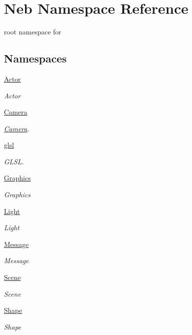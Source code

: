 \hypertarget{namespaceNeb}{\section{Neb Namespace Reference}
\label{namespaceNeb}
}


root namespace for   


\subsection*{Namespaces}
\begin{DoxyCompactItemize}
\item 
\hyperlink{namespaceNeb_1_1Actor}{Actor}
\begin{DoxyCompactList}\small\item\em Actor \end{DoxyCompactList}\item 
\hyperlink{namespaceNeb_1_1Camera}{Camera}
\begin{DoxyCompactList}\small\item\em \hyperlink{namespaceNeb_1_1Camera}{Camera}. \end{DoxyCompactList}\item 
\hyperlink{namespaceNeb_1_1glsl}{glsl}
\begin{DoxyCompactList}\small\item\em G\-L\-S\-L. \end{DoxyCompactList}\item 
\hyperlink{namespaceNeb_1_1Graphics}{Graphics}
\begin{DoxyCompactList}\small\item\em Graphics \end{DoxyCompactList}\item 
\hyperlink{namespaceNeb_1_1Light}{Light}
\begin{DoxyCompactList}\small\item\em Light \end{DoxyCompactList}\item 
\hyperlink{namespaceNeb_1_1Message}{Message}
\begin{DoxyCompactList}\small\item\em Message \end{DoxyCompactList}\item 
\hyperlink{namespaceNeb_1_1Scene}{Scene}
\begin{DoxyCompactList}\small\item\em Scene \end{DoxyCompactList}\item 
\hyperlink{namespaceNeb_1_1Shape}{Shape}
\begin{DoxyCompactList}\small\item\em Shape \end{DoxyCompactList}\end{DoxyCompactItemize}
